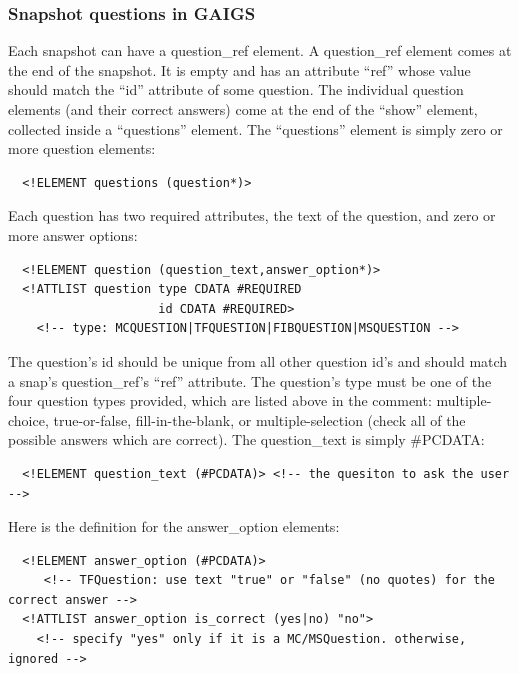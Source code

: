 \documentclass[12pt]{article}
\begin{document}
\subsubsection{Snapshot questions in GAIGS}


Each snapshot can have a question\_ref element. A question\_ref
element comes at the end of the snapshot. It is empty and has an
attribute ``ref'' whose value should match the ``id'' attribute of
some question. The individual question elements (and their correct
answers) come at the end of the ``show'' element, collected inside a
``questions'' element. The ``questions'' element is simply zero or
more question elements:


\footnotesize \begin{verbatim}
  <!ELEMENT questions (question*)>
\end{verbatim} \normalsize

Each question has two required attributes, the text of the question, and zero or more answer options:

\footnotesize \begin{verbatim}
  <!ELEMENT question (question_text,answer_option*)>
  <!ATTLIST question type CDATA #REQUIRED
                     id CDATA #REQUIRED>
    <!-- type: MCQUESTION|TFQUESTION|FIBQUESTION|MSQUESTION -->
\end{verbatim} \normalsize
  
  The question's id should be unique from all other question id's and
  should match a snap's question\_ref's ``ref'' attribute. The
  question's type must be one of the four question types provided,
  which are listed above in the comment: multiple-choice,
  true-or-false, fill-in-the-blank, or multiple-selection (check all
  of the possible answers which are correct). The question\_text is
  simply \#PCDATA:

\footnotesize \begin{verbatim}
  <!ELEMENT question_text (#PCDATA)> <!-- the quesiton to ask the user -->
\end{verbatim} \normalsize

Here is the definition for the answer\_option elements:

\footnotesize \begin{verbatim}
  <!ELEMENT answer_option (#PCDATA)>
     <!-- TFQuestion: use text "true" or "false" (no quotes) for the correct answer -->
  <!ATTLIST answer_option is_correct (yes|no) "no">
    <!-- specify "yes" only if it is a MC/MSQuestion. otherwise, ignored -->
\end{verbatim} \normalsize
\end{document}
